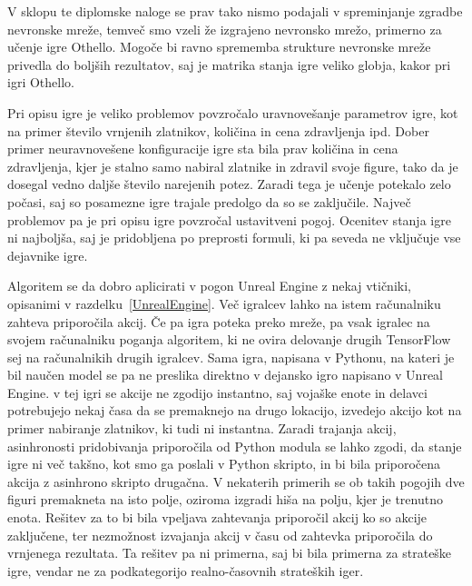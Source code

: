 \documentclass[a4paper, 12pt]{book}
\begin{document}
V sklopu te diplomske naloge se prav tako nismo podajali v spreminjanje zgradbe nevronske mreže, temveč smo vzeli že izgrajeno nevronsko mrežo, primerno za učenje igre Othello.
Mogoče bi ravno sprememba strukture nevronske mreže privedla do boljših rezultatov, saj je matrika stanja igre veliko globja, kakor pri igri Othello.

Pri opisu igre je veliko problemov povzročalo uravnovešanje parametrov igre, kot na primer število vrnjenih zlatnikov, količina in cena zdravljenja ipd.
Dober primer neuravnovešene konfiguracije igre sta bila prav količina in cena zdravljenja, kjer je stalno samo nabiral zlatnike in zdravil svoje figure, tako da je dosegal vedno daljše število narejenih potez.
Zaradi tega je učenje potekalo zelo počasi, saj so posamezne igre trajale predolgo da so se zaključile.
Največ problemov pa je pri opisu igre povzročal ustavitveni pogoj.
Ocenitev stanja igre ni najboljša, saj je pridobljena po preprosti formuli, ki pa seveda ne vključuje vse dejavnike igre.



Algoritem se da dobro aplicirati v pogon Unreal Engine z nekaj vtičniki, opisanimi v razdelku~\ref{UnrealEngine}. Več igralcev lahko na istem računalniku zahteva priporočila akcij. 
Če pa igra poteka preko mreže, pa vsak igralec na svojem računalniku poganja algoritem, ki ne ovira delovanje drugih TensorFlow sej na računalnikih drugih igralcev.
Sama igra, napisana v Pythonu, na kateri je bil naučen model se pa ne preslika direktno v dejansko igro napisano v Unreal Engine.
v tej igri se akcije ne zgodijo instantno, saj vojaške enote in delavci potrebujejo nekaj časa da se premaknejo na drugo lokacijo, izvedejo akcijo kot na primer nabiranje zlatnikov, ki tudi ni instantna.
Zaradi trajanja akcij, asinhronosti pridobivanja priporočila od Python modula se lahko zgodi, da stanje igre ni več takšno, kot smo ga poslali v Python skripto, in bi bila priporočena akcija z asinhrono skripto drugačna. 
V nekaterih primerih se ob takih pogojih dve figuri premakneta na isto polje, oziroma izgradi hiša na polju, kjer je trenutno enota. 
Rešitev za to bi bila vpeljava zahtevanja priporočil akcij ko so akcije zaključene, ter nezmožnost izvajanja akcij v času od zahtevka priporočila do vrnjenega rezultata.
Ta rešitev pa ni primerna, saj bi bila primerna za strateške igre, vendar ne za podkategorijo realno-časovnih strateških iger.
\end{document}
